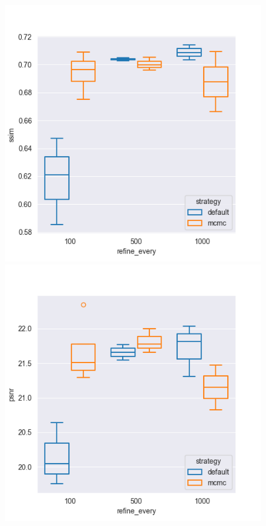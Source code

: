 \begin{figure}[h!]
    \centering
    \begin{minipage}{0.3\textwidth}
        \centering
        \includegraphics[width=\textwidth]{img/gs_metrics/ssim_refine_every.png}
    \end{minipage}
    \hfill
    \begin{minipage}{0.3\textwidth}
        \centering
        \includegraphics[width=\textwidth]{img/gs_metrics/psnr_refine_every.png}

\end{minipage}
\end{figure}
